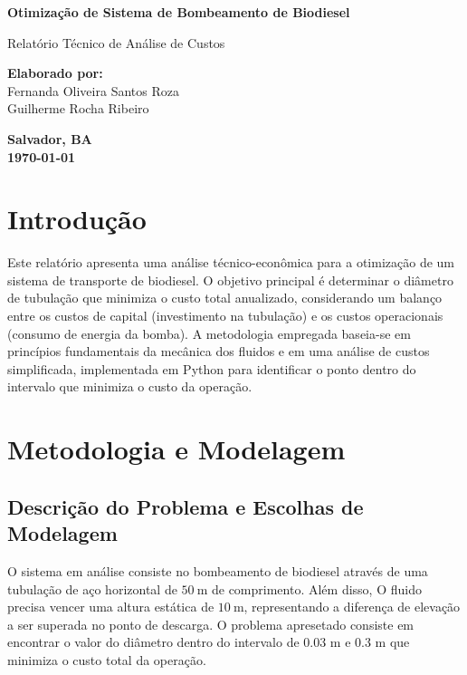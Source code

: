 \documentclass[12pt, a4paper]{article}
\begin{document}
\begin{titlepage}
        \vfill
        
        {\Huge\bfseries Otimização de Sistema de Bombeamento de Biodiesel} \\
        
        \vspace{1.5cm}
        
        {\Large Relatório Técnico de Análise de Custos} \\
        
        \vfill
        
        \begin{flushleft}
            \textbf{\large Elaborado por:} \\
            \vspace{0.2cm}
            Fernanda Oliveira Santos Roza \\
            Guilherme Rocha Ribeiro
        \end{flushleft}
        
        \vfill
        
        \textbf{\large Salvador, BA} \\
        \textbf{\large \today}

    \end{titlepage}

    \tableofcontents
    \newpage


    \section{Introdução}
    \justifying
    Este relatório apresenta uma análise técnico-econômica para a otimização de um sistema de transporte de biodiesel. O objetivo principal é determinar o diâmetro de tubulação que minimiza o custo total anualizado, considerando um balanço entre os custos de capital 
    (investimento na tubulação) e os custos operacionais (consumo de energia da bomba). A metodologia empregada baseia-se em princípios fundamentais da mecânica dos fluidos e em uma análise de custos simplificada, implementada em Python para identificar o ponto dentro do intervalo que minimiza o custo da operação.

    \section{Metodologia e Modelagem}

        \subsection{Descrição do Problema e Escolhas de Modelagem}
        O sistema em análise consiste no bombeamento de biodiesel através de uma tubulação de aço horizontal de $50~\mathrm{m}$ de comprimento. Além disso, O fluido precisa vencer uma altura estática de $10~\mathrm{m}$, representando a diferença de elevação a ser superada no ponto de descarga. O problema apresetado consiste em encontrar o valor do diâmetro dentro do intervalo de 0.03 m e 0.3 m que minimiza o custo total da operação.
\end{document}

